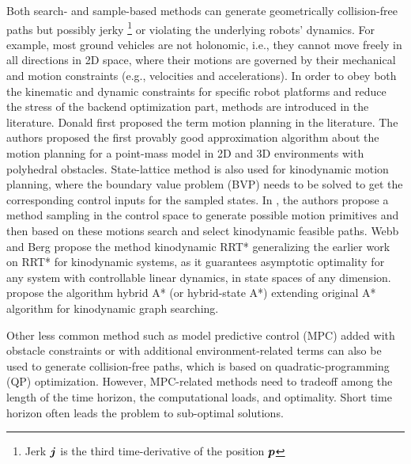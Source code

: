 \documentclass[letterpaper,journal,twoside]{IEEEtran}
\begin{document}
Both search- and sample-based methods can generate 
geometrically collision-free paths but possibly jerky
\footnote{Jerk $\boldsymbol{j}$ is the third time-derivative 
of the position $\boldsymbol{p}$} or 
violating the underlying robots' dynamics.
For example, most ground vehicles are not 
holonomic, i.e., they cannot move freely in all directions 
in 2D space, where their motions are governed by their 
mechanical and motion constraints (e.g., velocities and 
accelerations).
In order to obey both the kinematic and dynamic 
constraints for specific
robot platforms and reduce the stress of the backend 
optimization part,  methods are introduced
in the literature. 
Donald \etal \cite{donald1993kinodynamic} first proposed 
the term  motion planning in the literature.
The authors proposed the first provably good approximation 
algorithm about the motion planning for a point-mass model 
in 2D and 3D environments with polyhedral obstacles.
State-lattice method \cite{pivtoraiko2011kinodynamic} is also 
used for kinodynamic motion 
planning, where the boundary value problem (BVP) needs to be 
solved to get the corresponding control inputs 
for the sampled states. 
In \cite{zhou2019robust}, the authors propose a method 
sampling in the control space to generate possible motion 
primitives and then 
based on these motions search and select kinodynamic 
feasible paths. 
Webb and Berg \cite{webb2013kinodynamic} propose the method
kinodynamic RRT* generalizing the
earlier work on RRT* \cite{karaman2011sampling} for kinodynamic 
systems, as it guarantees asymptotic optimality for 
any system with controllable linear
dynamics, in state spaces of any dimension.
\cite{dolgov2008practical,dolgov2009autonomous,dolgov2010path}
propose the algorithm hybrid A* (or hybrid-state A*) extending 
original A* algorithm for kinodynamic graph searching.

Other less common method such as model predictive 
control (MPC) added with obstacle constraints or with 
additional environment-related 
terms \cite{park2009obstacle,ji2016path}  can also be 
used to generate collision-free paths, which is based on 
quadratic-programming (QP) optimization. 
However, MPC-related methods need to tradeoff among the 
length of the time horizon, the computational loads, and 
optimality. Short time horizon often leads the problem to 
sub-optimal solutions.
\end{document}
